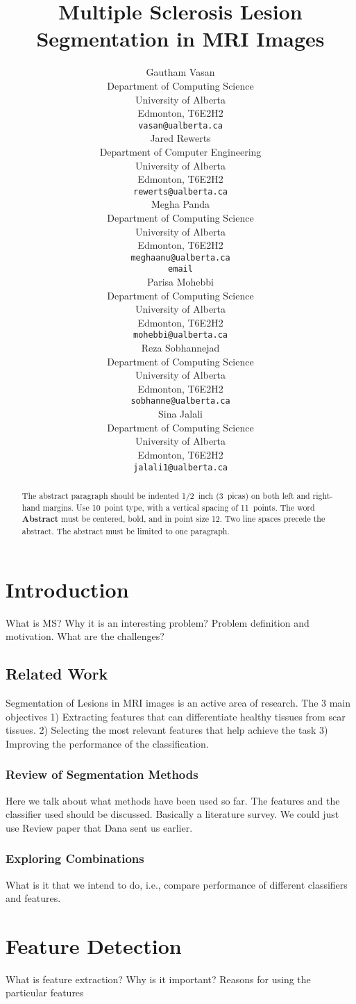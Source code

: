 \documentclass{article} %
\title{Multiple Sclerosis Lesion Segmentation in MRI Images }
\author{
Gautham Vasan \\
Department of Computing Science\\
University of Alberta\\
Edmonton, T6E2H2 \\
\texttt{vasan@ualberta.ca} \\
\And
Jared Rewerts \\
Department of Computer Engineering \\
University of Alberta \\Edmonton, T6E2H2 \\
\texttt{rewerts@ualberta.ca} \\
\And
Megha Panda \\
Department of Computing Science\\
University of Alberta \\Edmonton, T6E2H2 \\
\texttt{meghaanu@ualberta.ca} \\
\texttt{email} \\
\And
Parisa Mohebbi \\
Department of Computing Science \\
University of Alberta \\Edmonton, T6E2H2 \\
\texttt{mohebbi@ualberta.ca} \\
\And
Reza Sobhannejad \\
Department of Computing Science \\
University of Alberta \\Edmonton, T6E2H2 \\
\texttt{sobhanne@ualberta.ca} \\
\And
Sina Jalali  \\
Department of Computing Science \\
University of Alberta \\Edmonton, T6E2H2 \\
\texttt{jalali1@ualberta.ca} \\
}
\begin{document}
\maketitle
\begin{abstract}
The abstract paragraph should be indented 1/2~inch (3~picas) on both left and
right-hand margins. Use 10~point type, with a vertical spacing of 11~points.
The word \textbf{Abstract} must be centered, bold, and in point size 12. Two
line spaces precede the abstract. The abstract must be limited to one
paragraph.
\end{abstract}

\section{Introduction}
What is MS? Why it is an interesting problem? Problem definition and motivation. What are the challenges?

\subsection{Related Work}
Segmentation of Lesions in MRI images is an active area of research. The 3 main objectives 1) Extracting features that can differentiate healthy tissues from scar tissues. 2) Selecting the most relevant features that help achieve the task 3) Improving the performance of the classification.

\subsubsection{Review of Segmentation Methods}
Here we talk about what methods have been used so far. The features and the classifier used should be discussed. Basically a literature survey. We could just use Review paper that Dana sent us earlier. 

\subsubsection{ Exploring Combinations }
What is it that we intend to do, i.e., compare performance of different classifiers and features.

\section{Feature Detection}
What is feature extraction? Why is it important? Reasons for using the particular features
\end{document}
